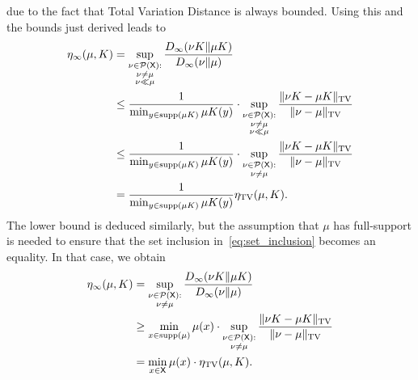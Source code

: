 \documentclass[conference,letterpaper]{IEEEtran}
\def \X{\mathsf X}
\def \calP{\mathcal P}
\def \supp {\mathrm{supp}}
\begin{document}
    due to the fact that Total Variation Distance is always bounded. Using this and the bounds just derived leads to
    \begin{align*}
        \eta_\infty(\mu, K) &= \sup_{\substack{\nu\in\calP(\X):\\\nu\neq\mu\\\nu\ll\mu}} \frac{D_\infty(\nu K\|\mu K)}{D_\infty(\nu\|\mu)} \\
        &\leq \frac1{\min_{y\in\supp(\mu K)}\mu K(y)}\cdot\sup_{\substack{\nu\in\calP(\X):\\\nu\neq\mu\\\nu\ll\mu}} \frac{\|\nu K-\mu K\|_{\rm TV}}{\|\nu-\mu\|_{\rm TV}} \\
        &\leq \frac1{\min_{y\in\supp(\mu K)}\mu K(y)}\cdot\sup_{\substack{\nu\in\calP(\X):\\\nu\neq\mu}} \frac{\|\nu K-\mu K\|_{\rm TV}}{\|\nu-\mu\|_{\rm TV}} \\
        &= \frac{1}{\min_{y\in\supp(\mu K)}\mu K(y)} \eta_{\rm TV}(\mu, K).
    \end{align*}
    The lower bound is deduced similarly, but the assumption that $\mu$ has full-support is needed to ensure that the set inclusion in~\cref{eq:set_inclusion} becomes an equality. In that case, we obtain
    \begin{align*}
        \eta_\infty(\mu, K) &= \sup_{\substack{\nu\in\calP(\X):\\\nu\neq\mu}} \frac{D_\infty(\nu K\|\mu K)}{D_\infty(\nu\|\mu)} \\
        &\geq \min_{x\in\supp(\mu)}\mu(x)\cdot\sup_{\substack{\nu\in\calP(\X):\\\nu\neq\mu}} \frac{\|\nu K-\mu K\|_{\rm TV}}{\|\nu-\mu\|_{\rm TV}} \\
        &= \min_{x\in\X}\mu(x)\cdot \eta_{\rm TV}(\mu, K).
    \end{align*}
\end{document}
